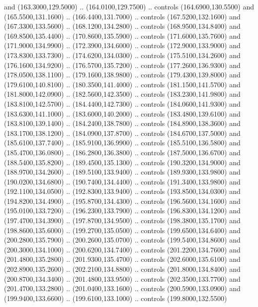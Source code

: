 {\begin{scope}[y=0.80pt, x=0.80pt, yscale=-1, xscale=1, inner sep=0pt, outer sep=0pt, #1]
      and (163.3000,129.5000) .. (164.0100,129.7500) .. controls (164.6900,130.5500)
      and (165.5500,131.1600) .. (166.4400,131.7000) .. controls (167.5200,132.1600)
      and (167.3300,133.5600) .. (168.1200,134.2800) .. controls (168.9500,134.8400)
      and (169.8500,135.4400) .. (170.8600,135.5900) .. controls (171.6000,135.7600)
      and (171.9000,134.9900) .. (172.3900,134.6000) .. controls (172.9000,133.9000)
      and (173.8300,133.7300) .. (174.6200,134.0300) .. controls (175.5100,134.2600)
      and (176.1600,134.9200) .. (176.5700,135.7200) .. controls (177.2600,136.9300)
      and (178.0500,138.1100) .. (179.1600,138.9800) .. controls (179.4300,139.8000)
      and (179.6100,140.8100) .. (180.3500,141.4000) .. controls (181.1500,141.5700)
      and (181.8000,142.0900) .. (182.5600,142.3500) .. controls (183.2300,141.9800)
      and (183.8100,142.5700) .. (184.4400,142.7300) .. controls (184.0600,141.9300)
      and (183.6300,141.1000) .. (183.6000,140.2000) .. controls (183.4800,139.6100)
      and (183.8100,139.1400) .. (184.2400,138.7800) .. controls (184.8900,138.3600)
      and (183.1700,138.1200) .. (184.0900,137.8700) .. controls (184.6700,137.5000)
      and (185.6100,137.7400) .. (185.9100,136.9900) .. controls (185.5100,136.5800)
      and (185.4700,136.0800) .. (186.2800,136.3800) .. controls (187.5000,136.6700)
      and (188.5400,135.8200) .. (189.4500,135.1300) .. controls (190.3200,134.9000)
      and (188.9700,134.2600) .. (189.5100,133.9400) .. controls (189.9300,133.9800)
      and (190.0200,134.6800) .. (190.7400,134.4400) .. controls (191.3400,133.9800)
      and (192.1100,134.0500) .. (192.8300,133.9400) .. controls (193.8500,134.0300)
      and (194.8200,134.4900) .. (195.8700,134.4300) .. controls (196.5600,134.1600)
      and (195.0100,133.7200) .. (196.2300,133.7900) .. controls (196.8300,134.1200)
      and (197.4700,134.3900) .. (197.8700,134.9500) .. controls (198.3800,135.1700)
      and (198.8600,135.6000) .. (199.2700,135.0500) .. controls (199.6500,134.6400)
      and (200.2800,135.7900) .. (200.2600,135.0700) .. controls (199.5400,134.8600)
      and (200.3000,134.1000) .. (200.6200,134.7400) .. controls (201.2200,134.7600)
      and (201.4800,135.2800) .. (201.9300,135.4700) .. controls (202.6000,135.6100)
      and (202.8900,135.2600) .. (202.2100,134.8800) .. controls (201.8000,134.8400)
      and (200.8700,134.3400) .. (201.4800,133.9500) .. controls (202.3500,133.7700)
      and (201.4700,133.2800) .. (201.0400,133.1600) .. controls (200.5900,133.0900)
      and (199.9400,133.6600) .. (199.6100,133.1000) .. controls (199.8000,132.5500)

\end{scope}}
